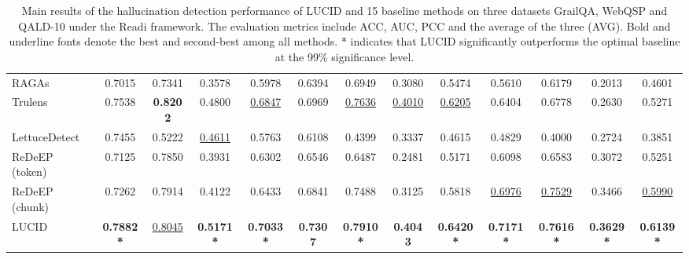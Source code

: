 \documentclass[11pt]{article}
\begin{document}
\begin{table}[t]
\begin{tabular}{l | c c c c | c c c c | c c c c}
\hline
RAGAs & 0.7015 & 0.7341 & 0.3578 & 0.5978 & 0.6394 & 0.6949 & 0.3080 & 0.5474 & 0.5610 & 0.6179 & 0.2013 & 0.4601 \\
Trulens & 0.7538 & \textbf{0.8202} & 0.4800 & \underline{0.6847} & 0.6969 & \underline{0.7636} & \underline{0.4010} & \underline{0.6205} & 0.6404 & 0.6778 & 0.2630 & 0.5271 \\
LettuceDetect & 0.7455 & 0.5222 & \underline{0.4611} & 0.5763 & 0.6108 & 0.4399 & 0.3337 & 0.4615 & 0.4829 & 0.4000 & 0.2724 & 0.3851 \\
ReDeEP (token) & 0.7125 & 0.7850 & 0.3931 & 0.6302 & 0.6546 & 0.6487 & 0.2481 & 0.5171 & 0.6098 & 0.6583 & 0.3072 & 0.5251 \\
ReDeEP (chunk) & 0.7262 & 0.7914 & 0.4122 & 0.6433 & 0.6841 & 0.7488 & 0.3125 & 0.5818 & \underline{0.6976} & \underline{0.7529} & 0.3466 & \underline{0.5990} \\
\hline
LUCID & \textbf{0.7882*} & \underline{0.8045} & \textbf{0.5171*} & \textbf{0.7033*} & \textbf{0.7307} & \textbf{0.7910*} & \textbf{0.4043} & \textbf{0.6420*} & \textbf{0.7171*} & \textbf{0.7616*} & \textbf{0.3629*} & \textbf{0.6139*} \\
\hline
\end{tabular}
\caption{\label{tab:main-readi}
Main results of the hallucination detection performance of LUCID and 15 baseline methods on three datasets GrailQA, WebQSP and QALD-10 under the Readi framework. The evaluation metrics include ACC, AUC, PCC and the average of the three (AVG). Bold and underline fonts denote the best and second-best among all methods. * indicates that LUCID significantly outperforms the optimal baseline at the 99\% significance level.
}
\end{table}
\end{document}
